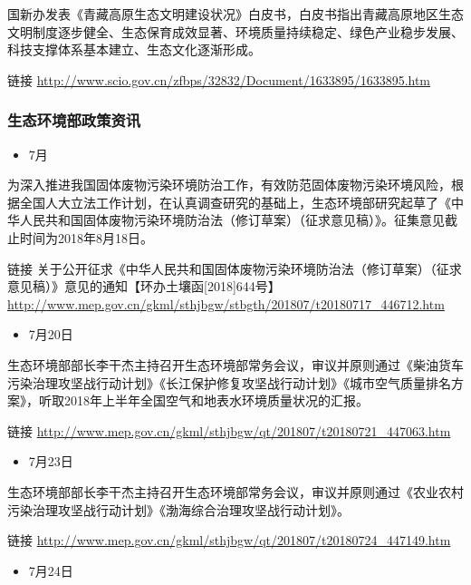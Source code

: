 \documentclass[]{book}
\providecommand{\tightlist}{%
  \setlength{\itemsep}{0pt}\setlength{\parskip}{0pt}}
\begin{document}
国新办发表《青藏高原生态文明建设状况》白皮书，白皮书指出青藏高原地区生态文明制度逐步健全、生态保育成效显著、环境质量持续稳定、绿色产业稳步发展、科技支撑体系基本建立、生态文化逐渐形成。

链接 \url{http://www.scio.gov.cn/zfbps/32832/Document/1633895/1633895.htm}

\hypertarget{ux751fux6001ux73afux5883ux90e8ux653fux7b56ux8d44ux8baf-3}{%
\subsubsection*{生态环境部政策资讯}\label{ux751fux6001ux73afux5883ux90e8ux653fux7b56ux8d44ux8baf-3}}

\begin{itemize}
\tightlist
\item
  7月
\end{itemize}

为深入推进我国固体废物污染环境防治工作，有效防范固体废物污染环境风险，根据全国人大立法工作计划，在认真调查研究的基础上，生态环境部研究起草了《中华人民共和国固体废物污染环境防治法（修订草案）（征求意见稿）》。征集意见截止时间为2018年8月18日。

链接 关于公开征求《中华人民共和国固体废物污染环境防治法（修订草案）（征求意见稿）》意见的通知【环办土壤函{[}2018{]}644号】\url{http://www.mep.gov.cn/gkml/sthjbgw/stbgth/201807/t20180717_446712.htm}

\begin{itemize}
\tightlist
\item
  7月20日
\end{itemize}

生态环境部部长李干杰主持召开生态环境部常务会议，审议并原则通过《柴油货车污染治理攻坚战行动计划》《长江保护修复攻坚战行动计划》《城市空气质量排名方案》，听取2018年上半年全国空气和地表水环境质量状况的汇报。

链接 \url{http://www.mep.gov.cn/gkml/sthjbgw/qt/201807/t20180721_447063.htm}

\begin{itemize}
\tightlist
\item
  7月23日
\end{itemize}

生态环境部部长李干杰主持召开生态环境部常务会议，审议并原则通过《农业农村污染治理攻坚战行动计划》《渤海综合治理攻坚战行动计划》。

链接 \url{http://www.mep.gov.cn/gkml/sthjbgw/qt/201807/t20180724_447149.htm}

\begin{itemize}
\tightlist
\item
  7月24日
\end{itemize}
\end{document}
